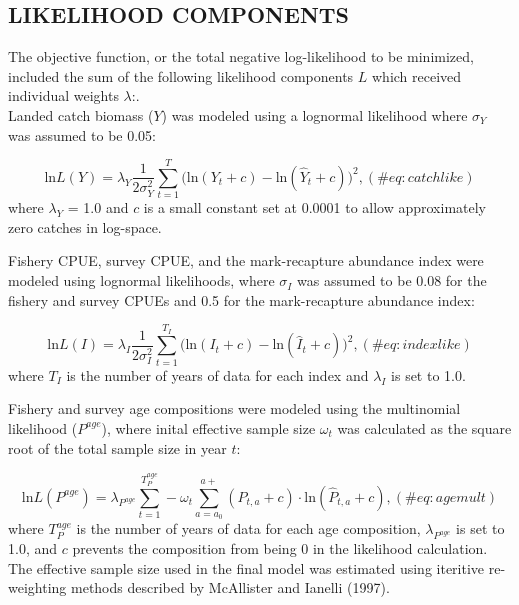 \documentclass[
]{article}
\begin{document}
\hypertarget{likelihood-components}{%
\subsection{LIKELIHOOD COMPONENTS}\label{likelihood-components}}

The objective function, or the total negative log-likelihood to be
minimized, included the sum of the following likelihood components \(L\)
which received individual weights \(\lambda\):.\\

Landed catch biomass (\(Y\)) was modeled using a lognormal likelihood
where \(\sigma_Y\) was assumed to be 0.05:

\[
\begin{equation}
\mbox{ln}L(Y)=\lambda_Y\frac{1}{2\sigma_Y^2}\sum_{t=1}^{T}\Big(\mbox{ln}(Y_t+c)-\mbox{ln}(\hat{Y}_t+c)\Big)^2 ,
(\#eq:catchlike)
\end{equation} 
\] where \(\lambda_Y\) = 1.0 and \(c\) is a small constant set at 0.0001
to allow approximately zero catches in log-space.

Fishery CPUE, survey CPUE, and the mark-recapture abundance index were
modeled using lognormal likelihoods, where \(\sigma_I\) was assumed to
be 0.08 for the fishery and survey CPUEs and 0.5 for the mark-recapture
abundance index:

\[
\begin{equation}
\mbox{ln}L(I)=\lambda_I\frac{1}{2\sigma_I^2}\sum_{t=1}^{T_I}\Big(\mbox{ln}(I_t+c)-\mbox{ln}(\hat{I}_t+c)\Big)^2 ,
(\#eq:indexlike)
\end{equation} 
\] where \(T_I\) is the number of years of data for each index and
\(\lambda_I\) is set to 1.0.

Fishery and survey age compositions were modeled using the multinomial
likelihood (\(P^{age}\)), where inital effective sample size
\(\omega_t\) was calculated as the square root of the total sample size
in year \(t\):

\[
\begin{equation}
\mbox{ln}L(P^{age})=\lambda_{P^{age}}\sum_{t=1}^{T_P^{age}} - \omega_t \sum_{a=a_0}^{a+} (P_{t,a}+c)\cdot\mbox{ln}(\hat{P}_{t,a}+c),
(\#eq:agemult)
\end{equation} 
\] where \(T_P^{age}\) is the number of years of data for each age
composition, \(\lambda_{P^{age}}\) is set to 1.0, and \(c\) prevents the
composition from being 0 in the likelihood calculation. The effective
sample size used in the final model was estimated using iteritive
re-weighting methods described by McAllister and Ianelli (1997).
\end{document}
